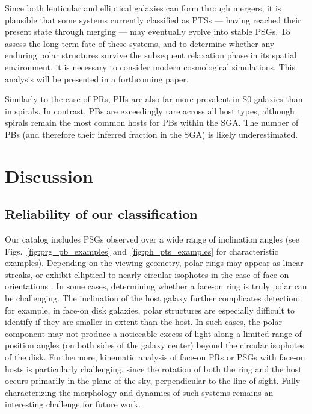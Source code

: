 \documentclass{aa}
\begin{document}
Since both lenticular and elliptical galaxies can form through mergers, it is plausible that some systems currently classified as PTSs --- having reached their present state through merging --- may eventually evolve into stable PSGs. To assess the long-term fate of these systems, and to determine whether any enduring polar structures survive the subsequent relaxation phase in its spatial environment, it is necessary to consider modern cosmological simulations. This analysis will be presented in a forthcoming paper.  

Similarly to the case of PRs, PHs are also far more prevalent in S0 galaxies than in spirals. In contrast, PBs are exceedingly rare across all host types, although spirals remain the most common hosts for PBs within the SGA. The number of PBs (and therefore their inferred fraction in the SGA) is likely underestimated.


\section{Discussion} \label{sec:discussion}

\subsection{Reliability of our classification} \label{sec:reliability}

Our catalog includes PSGs observed over a wide range of inclination angles (see Figs.~\ref{fig:prg_pb_examples} and~\ref{fig:ph_pts_examples} for characteristic examples). Depending on the viewing geometry, polar rings may appear as linear streaks, or exhibit elliptical to nearly circular isophotes in the case of face-on orientations \citep{1990AJ....100.1489W}. In some cases, determining whether a face-on ring is truly polar can be challenging. The inclination of the host galaxy further complicates detection: for example, in face-on disk galaxies, polar structures are especially difficult to identify if they are smaller in extent than the host. In such cases, the polar component may not produce a noticeable excess of light along a limited range of position angles (on both sides of the galaxy center) beyond the circular isophotes of the disk. Furthermore, kinematic analysis of face-on PRs or PSGs with face-on hosts is particularly challenging, since the rotation of both the ring and the host occurs primarily in the plane of the sky, perpendicular to the line of sight. Fully characterizing the morphology and dynamics of such systems remains an interesting challenge for future work. 
\end{document}
